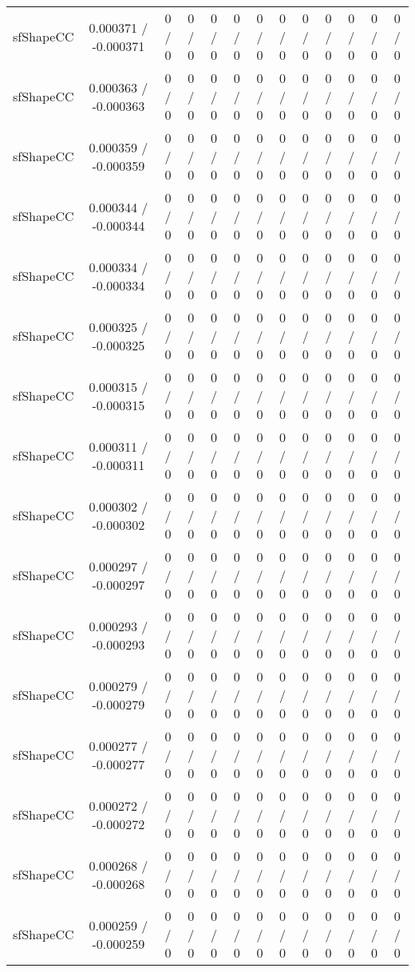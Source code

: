 \documentclass[10pt]{article}
\begin{document}
\begin{table}[htbp]
\begin{center}
\begin{tabular}{|c|c|c|c|c|c|c|c|c|c|c|c|c|}
  sfShapeCC & 0.000371 / -0.000371 & 0 / 0 & 0 / 0 & 0 / 0 & 0 / 0 & 0 / 0 & 0 / 0 & 0 / 0 & 0 / 0 & 0 / 0 & 0 / 0 & 0 / 0 \\ 
  sfShapeCC & 0.000363 / -0.000363 & 0 / 0 & 0 / 0 & 0 / 0 & 0 / 0 & 0 / 0 & 0 / 0 & 0 / 0 & 0 / 0 & 0 / 0 & 0 / 0 & 0 / 0 \\ 
  sfShapeCC & 0.000359 / -0.000359 & 0 / 0 & 0 / 0 & 0 / 0 & 0 / 0 & 0 / 0 & 0 / 0 & 0 / 0 & 0 / 0 & 0 / 0 & 0 / 0 & 0 / 0 \\ 
  sfShapeCC & 0.000344 / -0.000344 & 0 / 0 & 0 / 0 & 0 / 0 & 0 / 0 & 0 / 0 & 0 / 0 & 0 / 0 & 0 / 0 & 0 / 0 & 0 / 0 & 0 / 0 \\ 
  sfShapeCC & 0.000334 / -0.000334 & 0 / 0 & 0 / 0 & 0 / 0 & 0 / 0 & 0 / 0 & 0 / 0 & 0 / 0 & 0 / 0 & 0 / 0 & 0 / 0 & 0 / 0 \\ 
  sfShapeCC & 0.000325 / -0.000325 & 0 / 0 & 0 / 0 & 0 / 0 & 0 / 0 & 0 / 0 & 0 / 0 & 0 / 0 & 0 / 0 & 0 / 0 & 0 / 0 & 0 / 0 \\ 
  sfShapeCC & 0.000315 / -0.000315 & 0 / 0 & 0 / 0 & 0 / 0 & 0 / 0 & 0 / 0 & 0 / 0 & 0 / 0 & 0 / 0 & 0 / 0 & 0 / 0 & 0 / 0 \\ 
  sfShapeCC & 0.000311 / -0.000311 & 0 / 0 & 0 / 0 & 0 / 0 & 0 / 0 & 0 / 0 & 0 / 0 & 0 / 0 & 0 / 0 & 0 / 0 & 0 / 0 & 0 / 0 \\ 
  sfShapeCC & 0.000302 / -0.000302 & 0 / 0 & 0 / 0 & 0 / 0 & 0 / 0 & 0 / 0 & 0 / 0 & 0 / 0 & 0 / 0 & 0 / 0 & 0 / 0 & 0 / 0 \\ 
  sfShapeCC & 0.000297 / -0.000297 & 0 / 0 & 0 / 0 & 0 / 0 & 0 / 0 & 0 / 0 & 0 / 0 & 0 / 0 & 0 / 0 & 0 / 0 & 0 / 0 & 0 / 0 \\ 
  sfShapeCC & 0.000293 / -0.000293 & 0 / 0 & 0 / 0 & 0 / 0 & 0 / 0 & 0 / 0 & 0 / 0 & 0 / 0 & 0 / 0 & 0 / 0 & 0 / 0 & 0 / 0 \\ 
  sfShapeCC & 0.000279 / -0.000279 & 0 / 0 & 0 / 0 & 0 / 0 & 0 / 0 & 0 / 0 & 0 / 0 & 0 / 0 & 0 / 0 & 0 / 0 & 0 / 0 & 0 / 0 \\ 
  sfShapeCC & 0.000277 / -0.000277 & 0 / 0 & 0 / 0 & 0 / 0 & 0 / 0 & 0 / 0 & 0 / 0 & 0 / 0 & 0 / 0 & 0 / 0 & 0 / 0 & 0 / 0 \\ 
  sfShapeCC & 0.000272 / -0.000272 & 0 / 0 & 0 / 0 & 0 / 0 & 0 / 0 & 0 / 0 & 0 / 0 & 0 / 0 & 0 / 0 & 0 / 0 & 0 / 0 & 0 / 0 \\ 
  sfShapeCC & 0.000268 / -0.000268 & 0 / 0 & 0 / 0 & 0 / 0 & 0 / 0 & 0 / 0 & 0 / 0 & 0 / 0 & 0 / 0 & 0 / 0 & 0 / 0 & 0 / 0 \\ 
  sfShapeCC & 0.000259 / -0.000259 & 0 / 0 & 0 / 0 & 0 / 0 & 0 / 0 & 0 / 0 & 0 / 0 & 0 / 0 & 0 / 0 & 0 / 0 & 0 / 0 & 0 / 0 \\ 

\end{tabular}
\end{center}
\end{table}
\end{document}

